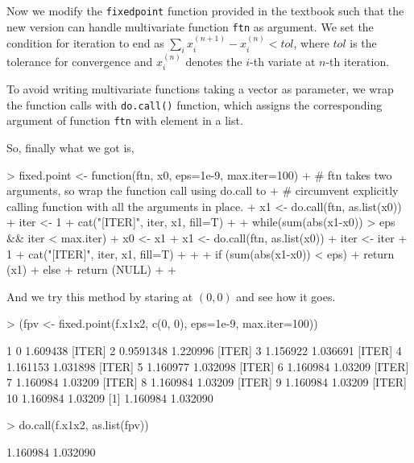 \documentclass{article}
\begin{document}
Now we modify the \verb=fixedpoint= function provided in the textbook such that
the new version can handle multivariate function \verb=ftn= as argument. We set
the condition for iteration to end as $\sum_i{x_i^{(n+1)} - x^{(n)}_i} < tol$,
where $tol$ is the tolerance for convergence and $x_i^{(n)}$ denotes the $i$-th
variate at $n$-th iteration.

To avoid writing multivariate functions taking a vector as parameter, we
wrap the function calls with \verb=do.call()= function, which assigns the
corresponding argument of function \verb=ftn= with element in a list.

So, finally what we got is,
\begin{Schunk}
\begin{Sinput}
> fixed.point <- function(ftn, x0, eps=1e-9, max.iter=100){
+     # ftn takes two arguments, so wrap the function call using do.call to
+     # circumvent explicitly calling function with all the arguments in place.
+     x1 <- do.call(ftn, as.list(x0)) 
+     iter <- 1
+     cat("[ITER]", iter, x1, fill=T)
+ 
+     while(sum(abs(x1-x0)) > eps && iter < max.iter){
+         x0 <- x1
+         x1 <- do.call(ftn, as.list(x0))
+         iter <- iter + 1
+         cat("[ITER]", iter, x1, fill=T)
+     }
+ 
+     if (sum(abs(x1-x0)) < eps){
+         return (x1)
+     } else {
+         return (NULL)
+     }
+ }
\end{Sinput}
\end{Schunk}

And we try this method by staring at $(0, 0)$ and see how it goes.

\begin{Schunk}
\begin{Sinput}
> (fpv <- fixed.point(f.x1x2, c(0, 0), eps=1e-9, max.iter=100))
\end{Sinput}
\begin{Soutput}
[ITER] 1 0 1.609438
[ITER] 2 0.9591348 1.220996
[ITER] 3 1.156922 1.036691
[ITER] 4 1.161153 1.031898
[ITER] 5 1.160977 1.032098
[ITER] 6 1.160984 1.03209
[ITER] 7 1.160984 1.03209
[ITER] 8 1.160984 1.03209
[ITER] 9 1.160984 1.03209
[ITER] 10 1.160984 1.03209
[1] 1.160984 1.032090
\end{Soutput}
\begin{Sinput}
> do.call(f.x1x2, as.list(fpv))
\end{Sinput}
\begin{Soutput}
[1] 1.160984 1.032090
\end{Soutput}
\end{Schunk}
\end{document}
